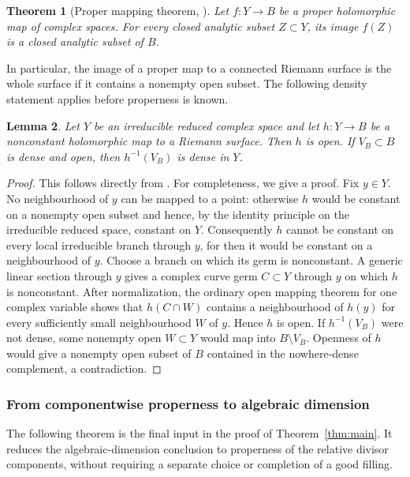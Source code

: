 \documentclass[11pt]{amsart}
\numberwithin{equation}{section}
\theoremstyle{plain}
\newtheorem{thm}{Theorem}[section]
\newtheorem{lemma}[thm]{Lemma}
\theoremstyle{definition}
\begin{document}
\begin{thm}[Proper mapping theorem,
{\cite[\S~7, Satz~1]{Gr60}}]\label{thm:revised-remmert}
Let $f:Y\to B$ be a proper holomorphic map of complex spaces.  For every
closed analytic subset $Z\subset Y$, its image $f(Z)$ is a closed
analytic subset of $B$.
\end{thm}

In particular, the image of a proper map to a connected Riemann surface
is the whole surface if it contains a nonempty open subset.
The following density statement applies before properness is known.

\begin{lemma}\label{lem:revised-open-density}
Let $Y$ be an irreducible reduced complex space and let
$h:Y\to B$ be a nonconstant holomorphic map to a Riemann surface.
Then $h$ is open.  If $V_B\subset B$ is dense and open, then
$h^{-1}(V_B)$ is dense in $Y$.
\end{lemma}

\begin{proof}
This follows directly from \cite[Chapter~II, Theorem~(5.7)]{Dem}.
For completeness, we give a proof.
Fix $y\in Y$.  No neighbourhood of $y$ can be mapped to a point: otherwise
$h$ would be constant on a nonempty open subset and hence, by the identity
principle on the irreducible reduced space, constant on $Y$.  Consequently
$h$ cannot be constant on every local irreducible branch through $y$, for
then it would be constant on a neighbourhood of $y$.  Choose a branch on
which its germ is nonconstant.  A generic linear section through $y$ gives
a complex curve germ $C\subset Y$ through $y$ on which $h$ is nonconstant.
After normalization, the ordinary open mapping theorem for one complex variable
shows that $h(C\cap W)$ contains a neighbourhood of $h(y)$ for every
sufficiently small neighbourhood $W$ of $y$.  Hence $h$ is open.
If $h^{-1}(V_B)$ were not dense, some nonempty open $W\subset Y$ would map
into $B\setminus V_B$.  Openness of $h$ would give a nonempty open subset
of $B$ contained in the nowhere-dense complement, a contradiction.
\end{proof}

\subsubsection{From componentwise properness to algebraic dimension}
The following theorem is the final input in the proof of
Theorem~\ref{thm:main}.  It reduces the algebraic-dimension conclusion
to properness of the relative divisor components, without requiring a
separate choice or completion of a good filling.
\end{document}
